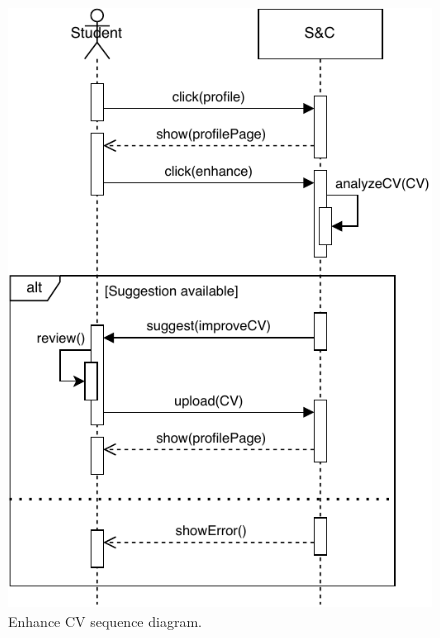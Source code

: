 \begin{figure}[H]
    \begin{center}
        \includegraphics[width=0.7\linewidth]{Images/SequenceDiagram/EnhanceCVSD.pdf}
        \caption{Enhance CV sequence diagram.}
        \label{fig:enhance_cv_seqdiag}%
    \end{center}
\end{figure}

\newpage

